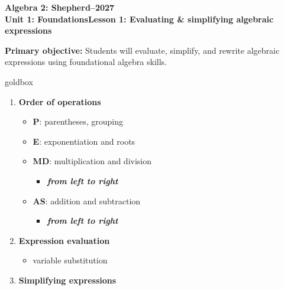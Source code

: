 \documentclass[10pt]{article}
\newcommand{\CourseName}{Algebra 2: Shepherd}
\newcommand{\SchoolYear}{2026--2027}
\newcommand{\UnitNumberName}{Unit 1: Foundations}
\newcommand{\LessonNumberName}{Lesson 1: Evaluating \& simplifying algebraic expressions}
\begin{document}
    \begin{center}
        {\Large\bfseries \CourseName \quad \SchoolYear \\
        {\small \bfseries \UnitNumberName \quad \LessonNumberName } }
    \end{center}

    \begin{tcolorbox}[colback=sky,colframe=navy,boxrule=0.9pt,arc=2mm,left=2mm,right=2mm,top=1.5mm,bottom=1.5mm]
        \textbf{Primary objective: }
        {Students will evaluate, simplify, and rewrite algebraic expressions using
        foundational algebra skills.}
    \end{tcolorbox}

    \renewcommand{\arraystretch}{1.6}
    \begin{skillbox}{goldbox}
        \begin{minipage}[t]{0.48\linewidth}
            \begin{enumerate}
                \item \textbf{Order of operations}
                \begin{itemize}
                    \item \textbf{P}: parentheses, grouping
                    \item \textbf{E}: exponentiation and roots
                    \item \textbf{MD}: multiplication and division
                    \begin{itemize}
                        \item \textbf{\textit{from left to right}}
                    \end{itemize}
                    \item \textbf{AS}: addition and subtraction
                    \begin{itemize}
                        \item \textbf{\textit{from left to right}}
                    \end{itemize}
                \end{itemize}
                \item \textbf{Expression evaluation}
                \begin{itemize}
                    \item variable substitution
                \end{itemize}
                \item \textbf{Simplifying expressions}

\end{enumerate}
\end{minipage}
\end{skillbox}
\end{document}
